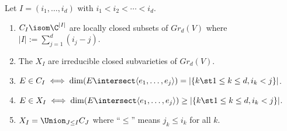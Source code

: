 \documentclass[11pt,leqno,oneside]{amsbook}
\numberwithin{thm}{section}
\newcommand{\Gr}{Gr}
\begin{document}
\begin{prop}
  Let \(I = (i_1, \ldots, i_d)\) with \(i_1 < i_2 < \cdots <
  i_d\). 
  \begin{enumerate}
  \item \(C_I \isom \C^{|I|}\) are locally closed subsets of
    \(\Gr_d(V)\) where \(|I| := \sum_{j=1}^d (i_j-j)\).
  \item The \(X_I\) are irreducible closed subvarieties of
    \(\Gr_d(V)\). 
  \item \(E \in C_I \iff \dim(E \intersect \langle e_1, \ldots, e_j
    \rangle) = |\{k \st 1 \leq k \leq d, i_k < j\}|\).
  \item \(E \in X_I \iff \dim(E \intersect \langle e_1, \ldots, e_j
    \rangle) \geq |\{k \st 1 \leq k \leq d, i_k < j\}|\).
  \item \(X_I = \Union_{J \leq I} C_J\) where ``\(\leq\)'' means \(j_k
    \leq i_k\) for all \(k\).
  \end{enumerate}
\end{prop}
\end{document}
